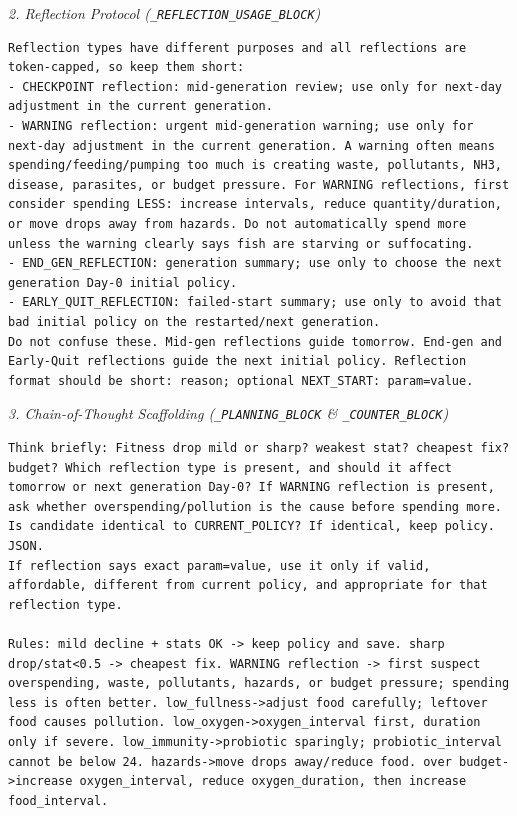 \documentclass[conference]{IEEEtran}
\begin{document}
\textit{2. Reflection Protocol (\texttt{\_REFLECTION\_USAGE\_BLOCK})}
\begin{lstlisting}
Reflection types have different purposes and all reflections are token-capped, so keep them short:
- CHECKPOINT reflection: mid-generation review; use only for next-day adjustment in the current generation.
- WARNING reflection: urgent mid-generation warning; use only for next-day adjustment in the current generation. A warning often means spending/feeding/pumping too much is creating waste, pollutants, NH3, disease, parasites, or budget pressure. For WARNING reflections, first consider spending LESS: increase intervals, reduce quantity/duration, or move drops away from hazards. Do not automatically spend more unless the warning clearly says fish are starving or suffocating.
- END_GEN_REFLECTION: generation summary; use only to choose the next generation Day-0 initial policy.
- EARLY_QUIT_REFLECTION: failed-start summary; use only to avoid that bad initial policy on the restarted/next generation.
Do not confuse these. Mid-gen reflections guide tomorrow. End-gen and Early-Quit reflections guide the next initial policy. Reflection format should be short: reason; optional NEXT_START: param=value.
\end{lstlisting}

\textit{3. Chain-of-Thought Scaffolding (\texttt{\_PLANNING\_BLOCK} \& \texttt{\_COUNTER\_BLOCK})}
\begin{lstlisting}
Think briefly: Fitness drop mild or sharp? weakest stat? cheapest fix? budget? Which reflection type is present, and should it affect tomorrow or next generation Day-0? If WARNING reflection is present, ask whether overspending/pollution is the cause before spending more. Is candidate identical to CURRENT_POLICY? If identical, keep policy. JSON.
If reflection says exact param=value, use it only if valid, affordable, different from current policy, and appropriate for that reflection type.

Rules: mild decline + stats OK -> keep policy and save. sharp drop/stat<0.5 -> cheapest fix. WARNING reflection -> first suspect overspending, waste, pollutants, hazards, or budget pressure; spending less is often better. low_fullness->adjust food carefully; leftover food causes pollution. low_oxygen->oxygen_interval first, duration only if severe. low_immunity->probiotic sparingly; probiotic_interval cannot be below 24. hazards->move drops away/reduce food. over budget->increase oxygen_interval, reduce oxygen_duration, then increase food_interval.
\end{lstlisting}
\end{document}
